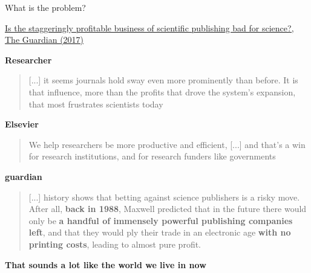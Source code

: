 \documentclass[10pt,compress,serif,aspectratio=169]{beamer}
\begin{document}
\begin{frame}[t]{What is the problem?}

\href{https://www.theguardian.com/science/2017/jun/27/profitable-business-scientific-publishing-bad-for-science}{Is the staggeringly profitable business of scientific publishing bad for science?, The Guardian (2017)}


\vfill
\textbf{Researcher}
\begin{quote}
  [...] it seems journals hold sway even more prominently than before. It is that influence, more than the profits that drove the system’s expansion, that most frustrates scientists today
\end{quote}

\textbf{Elsevier}
\begin{quote}
  We help researchers be more productive and efficient, [...] %
  and that’s a win for research institutions, and for research funders like governments
\end{quote}


\textbf{guardian}
\begin{quote}
[...] history shows that betting against science publishers is a risky move. After all, \textbf{back in 1988}, Maxwell predicted that in the future there would only be \textbf{a handful of immensely powerful publishing companies left}, and that they would ply their trade in an electronic age \textbf{with no printing costs}, leading to almost pure profit. 
\end{quote}
\begin{center}
  \textbf{That sounds a lot like the world we live in now}
\end{center}
\end{frame}
\end{document}

